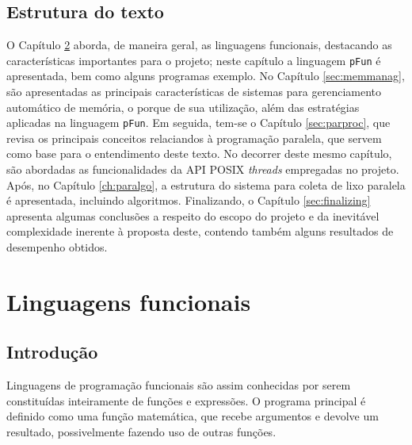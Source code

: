 \documentclass[ccc, pg2]{esinucpel}
\begin{document}

\section{Estrutura do texto}
O Capítulo \ref{sec:fun} aborda, de maneira geral, as linguagens funcionais, destacando as características importantes para o projeto; neste capítulo a linguagem {\tt pFun} é apresentada, bem como alguns programas exemplo. No Capítulo \ref{sec:memmanag}, são apresentadas as principais características de sistemas para gerenciamento automático de memória, o porque de sua utilização, além das estratégias aplicadas na linguagem {\tt pFun}. Em seguida, tem-se o Capítulo \ref{sec:parproc}, que revisa os principais conceitos relaciandos à programação paralela, que servem como base para o entendimento deste texto. No decorrer deste mesmo capítulo, são abordadas as funcionalidades da API POSIX {\it threads} empregadas no projeto. Após, no Capítulo \ref{ch:paralgo}, a estrutura do sistema para coleta de lixo paralela é apresentada, incluindo algoritmos. Finalizando, o Capítulo \ref{sec:finalizing} apresenta algumas conclusões a respeito do escopo do projeto e da inevitável complexidade inerente à proposta deste, contendo também alguns resultados de desempenho obtidos.


\chapter{Linguagens funcionais} \label{sec:fun}

\section{Introdução}
Linguagens de programação funcionais são assim conhecidas por serem constituídas inteiramente de funções e expressões. O programa principal é definido como uma função matemática, que recebe argumentos e devolve um resultado, possivelmente fazendo uso de outras funções.
\end{document}
